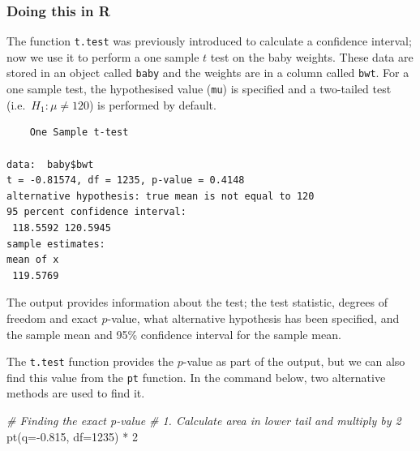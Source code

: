 \documentclass[
  oneside]{krantz}
\newenvironment{Shaded}{\begin{snugshade}}{\end{snugshade}}
\newcommand{\AttributeTok}[1]{\textcolor[rgb]{0.77,0.63,0.00}{#1}}
\newcommand{\CommentTok}[1]{\textcolor[rgb]{0.56,0.35,0.01}{\textit{#1}}}
\newcommand{\DecValTok}[1]{\textcolor[rgb]{0.00,0.00,0.81}{#1}}
\newcommand{\FloatTok}[1]{\textcolor[rgb]{0.00,0.00,0.81}{#1}}
\newcommand{\FunctionTok}[1]{\textcolor[rgb]{0.00,0.00,0.00}{#1}}
\newcommand{\NormalTok}[1]{#1}
\newcommand{\SpecialCharTok}[1]{\textcolor[rgb]{0.00,0.00,0.00}{#1}}
\begin{document}
\hypertarget{doing-this-in-r-12}{%
\subsubsection{Doing this in R}\label{doing-this-in-r-12}}

The function \texttt{t.test} was previously introduced to calculate a confidence interval; now we use it to perform a one sample \(t\) test on the baby weights. These data are stored in an object called \texttt{baby} and the weights are in a column called \texttt{bwt}. For a one sample test, the hypothesised value (\texttt{mu}) is specified and a two-tailed test (i.e.~\(H_1: \mu \ne 120\)) is performed by default.

\begin{Shaded}
\end{Shaded}

\begin{verbatim}
    One Sample t-test

data:  baby$bwt
t = -0.81574, df = 1235, p-value = 0.4148
alternative hypothesis: true mean is not equal to 120
95 percent confidence interval:
 118.5592 120.5945
sample estimates:
mean of x 
 119.5769 
\end{verbatim}

The output provides information about the test; the test statistic, degrees of freedom and exact \(p\)-value, what alternative hypothesis has been specified, and the sample mean and 95\% confidence interval for the sample mean.

The \texttt{t.test} function provides the \(p\)-value as part of the output, but we can also find this value from the \texttt{pt} function. In the command below, two alternative methods are used to find it.

\begin{Shaded}
\begin{Highlighting}[]
\CommentTok{\# Finding the exact p{-}value}
\CommentTok{\# 1. Calculate area in lower tail and multiply by 2}
\FunctionTok{pt}\NormalTok{(}\AttributeTok{q=}\SpecialCharTok{{-}}\FloatTok{0.815}\NormalTok{, }\AttributeTok{df=}\DecValTok{1235}\NormalTok{) }\SpecialCharTok{*} \DecValTok{2}
\end{Highlighting}
\end{Shaded}
\end{document}
